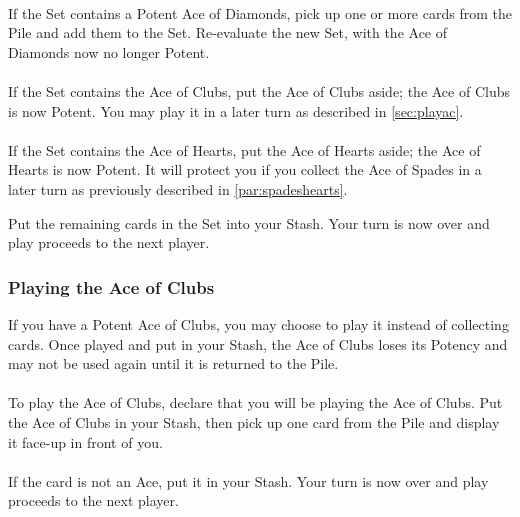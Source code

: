 \documentclass{article}
\begin{document}
\paragraph{}
If the Set contains a Potent Ace of Diamonds, pick up one or more cards
from the Pile and add them to the Set. Re-evaluate the new Set, with the
Ace of Diamonds now no longer Potent.

\paragraph{}
If the Set contains the Ace of Clubs, put the Ace of Clubs aside; the
Ace of Clubs is now Potent. You may play it in a later turn as described
in \autoref{sec:playac}.

\paragraph{}
If the Set contains the Ace of Hearts, put the Ace of Hearts aside; the
Ace of Hearts is now Potent. It will protect you if you collect the Ace
of Spades in a later turn as previously described in
\autoref{par:spadeshearts}.

Put the remaining cards in the Set into your Stash. Your turn is now
over and play proceeds to the next player.

\subsubsection{Playing the Ace of Clubs}
\label{sec:playac}

If you have a Potent Ace of Clubs, you may choose to play it instead of
collecting cards. Once played and put in your Stash, the Ace of Clubs
loses its Potency and may not be used again until it is returned to the
Pile.

\paragraph{}
To play the Ace of Clubs, declare that you will be playing the Ace of
Clubs. Put the Ace of Clubs in your Stash, then pick up one card from
the Pile and display it face-up in front of you.

\paragraph{}
If the card is not an Ace, put it in your Stash. Your turn is now over
and play proceeds to the next player.
\end{document}
